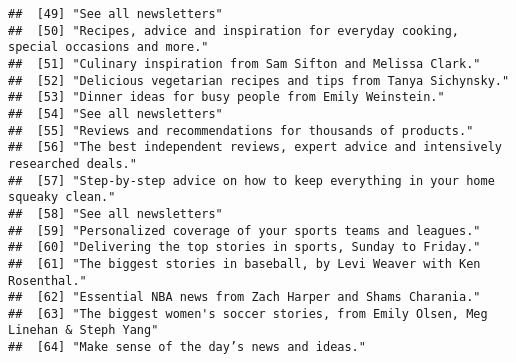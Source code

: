 \documentclass[
]{article}
\begin{document}
\begin{verbatim}
##  [49] "See all newsletters"                                                                                                                                      
##  [50] "Recipes, advice and inspiration for everyday cooking, special occasions and more."                                                                        
##  [51] "Culinary inspiration from Sam Sifton and Melissa Clark."                                                                                                  
##  [52] "Delicious vegetarian recipes and tips from Tanya Sichynsky."                                                                                              
##  [53] "Dinner ideas for busy people from Emily Weinstein."                                                                                                       
##  [54] "See all newsletters"                                                                                                                                      
##  [55] "Reviews and recommendations for thousands of products."                                                                                                   
##  [56] "The best independent reviews, expert advice and intensively researched deals."                                                                            
##  [57] "Step-by-step advice on how to keep everything in your home squeaky clean."                                                                                
##  [58] "See all newsletters"                                                                                                                                      
##  [59] "Personalized coverage of your sports teams and leagues."                                                                                                  
##  [60] "Delivering the top stories in sports, Sunday to Friday."                                                                                                  
##  [61] "The biggest stories in baseball, by Levi Weaver with Ken Rosenthal."                                                                                      
##  [62] "Essential NBA news from Zach Harper and Shams Charania."                                                                                                  
##  [63] "The biggest women's soccer stories, from Emily Olsen, Meg Linehan & Steph Yang"                                                                           
##  [64] "Make sense of the day’s news and ideas."                                                                                                                  

\end{verbatim}
\end{document}
